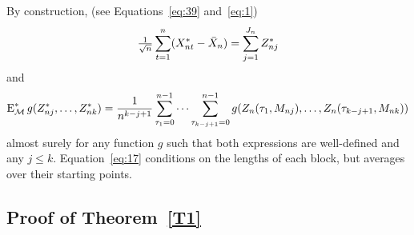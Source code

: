 \documentclass[11pt]{article}
\begin{document}
By construction, (see Equations~\eqref{eq:39} and~\eqref{eq:1})
\begin{equation}\label{eq:16}
  \tfrac{1}{\sqrt{n}} \sum_{t=1}^n (X_{nt}^{*} - \bar X_n)
  = \sum_{j=1}^{J_n} \Zb
\end{equation}
and
\begin{equation}\label{eq:17}
  \Em^{*}g(\Zb,\dots,\Zb[k]) = \frac{1}{n^{k-j+1}}
  \sum_{\tau_1=0}^{n-1} \cdots \sum_{\tau_{k-j+1}=0}^{n-1}
  g(Z_n(\tau_1, M_{nj}),\dots,Z_n(\tau_{k-j+1}, M_{nk}))
\end{equation}
almost surely for any function $g$ such that both
expressions are well-defined and any $j \leq k$. Equation~\eqref{eq:17}
conditions on the lengths of each block, but averages over their
starting points.

\subsection*{Proof of Theorem~\ref{T1}}
\end{document}
